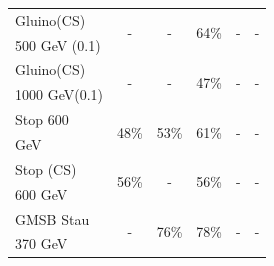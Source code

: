 \begin{table}
\begin{center}
\begin{tabular}{|l|c|c|c|c|c|}
Gluino(CS)    & \multirow{2}{*}{-}    & \multirow{2}{*}{-}    & \multirow{2}{*}{64\%} & \multirow{2}{*}{-}    & \multirow{2}{*}{-} \\
500 GeV (0.1) &                       &                       &                       &                       &                    \\ \hline
Gluino(CS)    & \multirow{2}{*}{-}    & \multirow{2}{*}{-}    & \multirow{2}{*}{47\%} & \multirow{2}{*}{-}    & \multirow{2}{*}{-} \\
1000 GeV(0.1) &     	      	      	&     	      	      	&     	      	      	&     	      	      	&     	      	     \\ \hline
Stop 600      & \multirow{2}{*}{48\%} & \multirow{2}{*}{53\%} & \multirow{2}{*}{61\%} & \multirow{2}{*}{-}    & \multirow{2}{*}{-} \\
GeV           &     	      	      	&     	      	      	&     	      	      	&     	      	      	&     	      	     \\ \hline
Stop (CS)     & \multirow{2}{*}{56\%} & \multirow{2}{*}{-}    & \multirow{2}{*}{56\%} & \multirow{2}{*}{-}    & \multirow{2}{*}{-} \\
600 GeV       &     	      	      	&     	      	      	&     	      	      	&     	      	      	&     	      	     \\ \hline
GMSB Stau     & \multirow{2}{*}{-}    & \multirow{2}{*}{76\%}    & \multirow{2}{*}{78\%} & \multirow{2}{*}{-}    & \multirow{2}{*}{-} \\
370 GeV       &     	      	      	&     	      	      	&     	      	      	&     	      	      	&     	      	     \\ \hline
   \end{tabular}
 \end{center}
\end{table}


